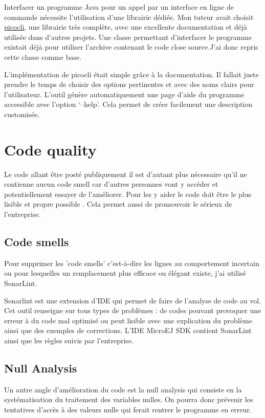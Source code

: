 \documentclass[french,a4paper,12pt]{report}
\begin{document}
Interfacer un programme Java pour un appel par un interface en ligne de commande nécessite l’utilisation d’une librairie dédiée. Mon tuteur avait choisit \href{https://picocli.info/}{picocli}, une librairie très complète, avec une excellente documentation et déjà utilisée dans d'autres projets. Une classe permettant d’interfacer le programme existait déjà pour utiliser l’archive contenant le code close source.J’ai donc repris cette classe comme base. 

L’implémentation de picocli était simple grâce à la documentation. Il fallait juste prendre le temps de choisir  des options pertinentes et avec des noms clairs pour l’utilisateur. L’outil génère automatiquement une page d’aide du programme accessible avec l’option ‘--help’. Cela permet de créer facilement une description customisée.

\section{Code quality}

Le code allant être posté publiquement il est d’autant plus nécessaire qu’il ne contienne aucun code smell car d’autres personnes vont y accéder et potentiellement essayer de l’améliorer. Pour les y aider le code doit être le plus lisible et propre possible . Cela permet aussi de promouvoir le sérieux de l’entreprise. 

\subsection{Code smells}

Pour supprimer les 'code smells' c'est-à-dire les lignes au comportement incertain ou pour lesquelles un remplacement plus efficace ou élégant existe, j'ai utilisé SonarLint.

Sonarlint est une extension d’IDE qui permet de faire de l’analyse de code au vol. Cet outil renseigne sur tous types de problèmes : de codes pouvant provoquer une erreur à du code mal optimisé ou peut lisible avec une explication du problème ainsi que des exemples de corrections.
L'IDE MicroEJ SDK contient SonarLint ainsi que les règles suivis par l'entreprise.

\subsection{Null Analysis}

Un autre angle d'amélioration du code est la null analysis qui consiste en la systématisation du traitement des variables nulles. On pourra donc prévenir les tentatives d'accès à des valeurs nulle qui ferait rentrer le programme en erreur. 
\end{document}
